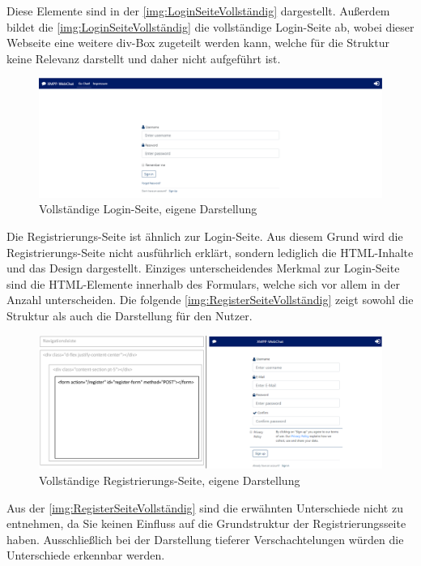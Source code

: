 \documentclass[a4paper,titlepage,halfparskip,12pt]{scrreprt}
\begin{document}
\begin{onehalfspacing}
Diese Elemente sind in der \autoref{img:LoginSeiteVollständig} dargestellt. Außerdem bildet die \autoref{img:LoginSeiteVollständig} die vollständige Login-Seite ab, wobei dieser Webseite eine weitere div-Box zugeteilt werden kann, welche für die Struktur keine Relevanz darstellt und daher nicht aufgeführt ist.
\begin{figure}[h]
	\centering
	\includegraphics[width=\linewidth]{images/loginSeiteFertig}
	\caption{Vollständige Login-Seite, eigene Darstellung}
	\label{img:LoginSeiteVollständig}
\end{figure}
Die Registrierungs-Seite ist ähnlich zur Login-Seite. Aus diesem Grund wird die Registrierungs-Seite nicht ausführlich erklärt, sondern lediglich die HTML-Inhalte und das Design dargestellt. Einziges unterscheidendes Merkmal zur Login-Seite sind die HTML-Elemente innerhalb des Formulars, welche sich vor allem in der Anzahl unterscheiden. Die folgende \autoref{img:RegisterSeiteVollständig} zeigt sowohl die Struktur als auch die Darstellung für den Nutzer.
\begin{figure}[h]
	\centering
	\includegraphics[width=\linewidth]{images/RegisterPage2}
	\caption{Vollständige Registrierungs-Seite, eigene Darstellung}
	\label{img:RegisterSeiteVollständig}
\end{figure}
Aus der \autoref{img:RegisterSeiteVollständig} sind die erwähnten Unterschiede nicht zu entnehmen, da Sie keinen Einfluss auf die Grundstruktur der Registrierungsseite haben. Ausschließlich bei der Darstellung tieferer Verschachtelungen würden die Unterschiede erkennbar werden.\\ 

\end{onehalfspacing}
\end{document}
